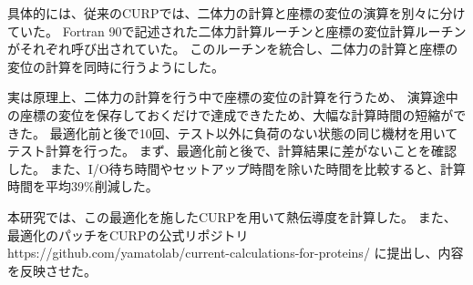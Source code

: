 具体的には、従来のCURPでは、二体力の計算と座標の変位の演算を別々に分けていた。
Fortran 90で記述された二体力計算ルーチンと座標の変位計算ルーチンがそれぞれ呼び出されていた。
このルーチンを統合し、二体力の計算と座標の変位の計算を同時に行うようにした。

実は原理上、二体力の計算を行う中で座標の変位の計算を行うため、
演算途中の座標の変位を保存しておくだけで達成できたため、大幅な計算時間の短縮ができた。
最適化前と後で10回、テスト以外に負荷のない状態の同じ機材を用いてテスト計算を行った。
まず、最適化前と後で、計算結果に差がないことを確認した。
また、I/O待ち時間やセットアップ時間を除いた時間を比較すると、計算時間を平均39\%削減した。

本研究では、この最適化を施したCURPを用いて熱伝導度を計算した。
また、最適化のパッチをCURPの公式リポジトリ https://github.com/yamatolab/current-calculations-for-proteins/ に提出し、内容を反映させた。
